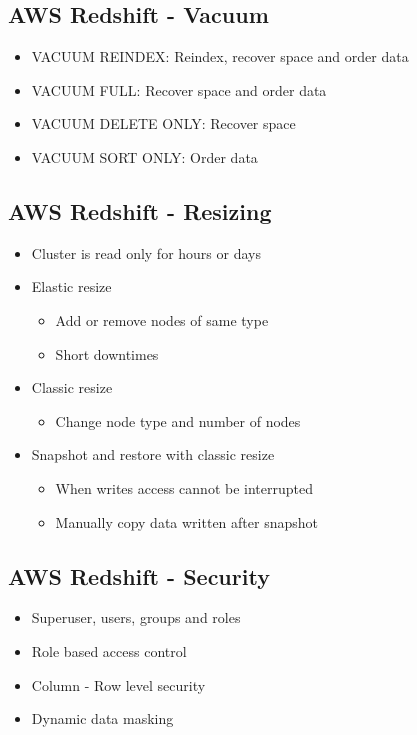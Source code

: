 \documentclass[../../main.tex]{subfiles}
\begin{document}
\subsection{AWS Redshift - Vacuum}
\begin{itemize}
    \item VACUUM REINDEX: Reindex, recover space and order data
    \item VACUUM FULL: Recover space and order data
    \item VACUUM DELETE ONLY: Recover space
    \item VACUUM SORT ONLY: Order data
\end{itemize}

\subsection{AWS Redshift - Resizing}
\begin{itemize}
    \item Cluster is read only for hours or days
    \item Elastic resize
    \begin{itemize}
        \item Add or remove nodes of same type
        \item Short downtimes
    \end{itemize}
    \item Classic resize
    \begin{itemize}
        \item Change node type and number of nodes
    \end{itemize}
    \item Snapshot and restore with classic resize
    \begin{itemize}
        \item When writes access cannot be interrupted
        \item Manually copy data written after snapshot
    \end{itemize}
\end{itemize}

\subsection{AWS Redshift - Security}
\begin{itemize}
    \item Superuser, users, groups and roles
    \item Role based access control
    \item Column - Row level security
    \item Dynamic data masking
\end{itemize}
\end{document}
